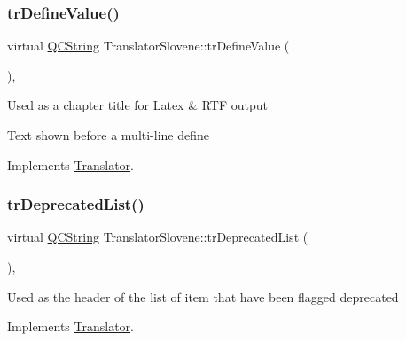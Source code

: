 \mbox{\label{class_translator_slovene_ab1712e6a163ddf505ccf3f87496d239f}} 
\subsubsection{\texorpdfstring{trDefineValue()}{trDefineValue()}}
{\footnotesize\ttfamily virtual \mbox{\hyperlink{class_q_c_string}{Q\+C\+String}} Translator\+Slovene\+::tr\+Define\+Value (\begin{DoxyParamCaption}{ }\end{DoxyParamCaption})\hspace{0.3cm}{\ttfamily [inline]}, {\ttfamily [virtual]}}

Used as a chapter title for Latex \& R\+TF output

Text shown before a multi-\/line define 

Implements \mbox{\hyperlink{class_translator}{Translator}}.

\mbox{\label{class_translator_slovene_aa82c7b475e3a1ee9316a556fb4478ab3}} 
\subsubsection{\texorpdfstring{trDeprecatedList()}{trDeprecatedList()}}
{\footnotesize\ttfamily virtual \mbox{\hyperlink{class_q_c_string}{Q\+C\+String}} Translator\+Slovene\+::tr\+Deprecated\+List (\begin{DoxyParamCaption}{ }\end{DoxyParamCaption})\hspace{0.3cm}{\ttfamily [inline]}, {\ttfamily [virtual]}}

Used as the header of the list of item that have been flagged deprecated 

Implements \mbox{\hyperlink{class_translator}{Translator}}.

\mbox{\label{class_translator_slovene_a44f4fa649bd9b625c3f222b04f95d82a}} 

